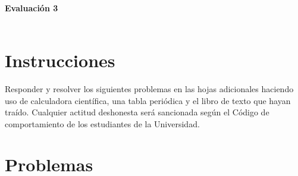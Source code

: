 \documentclass[a4paper,12pt]{article}
\begin{document}

\begin{center}
\HRule \\[0.4cm]
{ \bfseries Evaluaci\'on 3}\\ %
\HRule \\[0.4cm]
\end{center}


\section*{Instrucciones}

Responder y resolver los siguientes problemas en las hojas adicionales haciendo uso de calculadora cient\'ifica, una tabla peri\'odica y el libro de texto que hayan tra\'ido. Cualquier actitud deshonesta ser\'a sancionada seg\'un el C\'odigo de comportamiento de los estudiantes de la Universidad.

\section*{Problemas}
\end{document}
